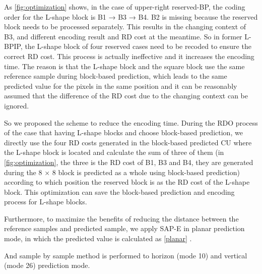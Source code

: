 \documentclass[journal]{IEEEtran}
\begin{document}
As \autoref{fig:optimization} shows, in the case of upper-right reserved-BP, the coding order for the L-shape block is B1 → B3 → B4. B2 is missing because the reserved block needs to be processed separately. This results in the changing context of B3, and different encoding result and RD cost at the meantime. So in former L-BPIP, the L-shape block of  four reserved cases need to be recoded to ensure the correct RD cost. This process is actually ineffective and it increases the encoding time. The reason is that the L-shape block and the square block use the same reference sample during block-based prediction, which leads to the same predicted value for the pixels in the same position and it can be reasonably assumed that the difference of the RD cost due to the changing context can be ignored.

So we proposed the scheme to reduce the encoding time. During the RDO process of the case that having L-shape blocks and choose block-based prediction, we directly use the four RD costs generated in the block-based predicted CU where the L-shape block is located and calculate the sum of  three of them (in \autoref{fig:optimization}, the three is the RD cost of B1, B3 and B4, they are generated during the 8 × 8 block is predicted as a whole using block-based prediction) according to which position the reserved block is as the RD cost of the L-shape block. This optimization can save the block-based prediction and encoding process for L-shape blocks.

Furthermore, to maximize the benefits of reducing the distance between the reference samples and predicted sample, we apply SAP-E \cite{09}  in planar prediction mode, in which the predicted value is calculated as \autoref{planar} \cite{29}.

And sample by sample method is performed to horizon (mode 10) and vertical (mode 26) prediction mode.
\end{document}

